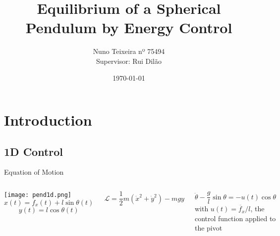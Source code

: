 \documentclass{beamer}
\title[Equilibrium of a Spherical Pendulum]{Equilibrium of a Spherical Pendulum by Energy Control}
\author[Nuno Teixeira]{Nuno Teixeira nº 75494\\[10mm]{\small Supervisor: Rui Dilão}}
\institute{Instituto Superior Técnico}
\date{\today}
\begin{document}
\begin{frame}
  \titlepage
\end{frame}


\section{Introduction}
\subsection{1D Control}
\begin{frame}[t]{Equation of Motion}
       \begin{columns}
             \centering
             \texttt{[image: pend1d.png]}
             \begin{equation}
x(t)=f_x(t)+ l \sin{\theta}(t)
\label{x1d}
\end{equation}
\begin{equation}
y(t)= l \cos{\theta}(t)
\label{y1d}
\end{equation}
\vspace{0.5 cm}


\begin{equation}
    \mathcal{L}=\frac{1}{2}m\left(\dot{x}^2+\dot{y}^2\right)-m g y
    \label{l1d}
\end{equation}
\vspace{0.5 cm}


\begin{equation}
    \ddot{\theta}-\frac{g}{l}\sin{\theta}=-u(t)\cos{\theta}
    \label{theta1d}
\end{equation}
with $u(t)=\ddot{f_x}/l$, the control function applied to the pivot
\end{columns} 
\end{frame}
\end{document}

